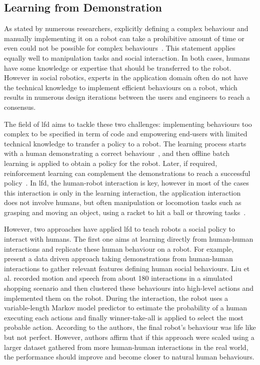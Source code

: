 \subsection{Learning from Demonstration} \label{ssec:back_lfd}

As stated by numerous researchers, explicitly defining a complex behaviour and manually implementing it on a robot can take a prohibitive amount of time or even could not be possible for complex behaviours~\citep{argall2009survey,billard2008robot,dautenhahn2004robots}. This statement applies equally well to manipulation tasks and social interaction. In both cases, humans have some knowledge or expertise that should be transferred to the robot. However in social robotics, experts in the application domain often do not have the technical knowledge to implement efficient behaviours on a robot, which results in numerous design iterations between the users and engineers to reach a consensus. 

The field of \gls{lfd} aims to tackle these two challenges: implementing behaviours too complex to be specified in term of code and empowering end-users with limited technical knowledge to transfer a policy to a robot. The learning process starts with a human demonstrating a correct behaviour~\citep{argall2009survey}, and then offline batch learning is applied to obtain a policy for the robot. Later, if required, reinforcement learning can complement the demonstrations to reach a successful policy~\citep{billard2008robot}.
In \gls{lfd}, the human-robot interaction is key, however in most of the cases this interaction is only in the learning interaction, the application interaction does not involve humans, but often manipulation or locomotion tasks such as grasping and moving an object, using a racket to hit a ball or throwing tasks~\citep{billard2008robot}.

However, two approaches have applied \gls{lfd} to teach robots a social policy to interact with humans.	The first one aims at learning directly from human-human interactions and replicate these human behaviour on a robot. For example, \citet{liu2014train} present a data driven approach taking demonstrations from human-human interactions to gather relevant features defining human social behaviours. Liu et al. recorded motion and speech from about 180 interactions in a simulated shopping scenario and then clustered these behaviours into high-level actions and implemented them on the robot. During the interaction, the robot uses a variable-length Markov model predictor to estimate the probability of a human executing each actions and finally winner-take-all is applied to select the most probable action. According to the authors, the final robot's behaviour was life like but not perfect. However, authors affirm that if this approach were scaled using a larger dataset gathered from more human-human interactions in the real world, the performance should improve and become closer to natural human behaviours.

